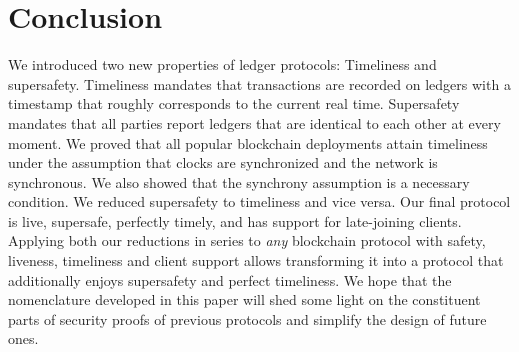 \section{Conclusion}

We introduced two new properties of ledger protocols:
Timeliness and supersafety. Timeliness mandates that transactions are
recorded on ledgers with a timestamp that roughly corresponds to the
current real time. Supersafety mandates that all parties
report ledgers that are identical to each other at every moment.
We proved that all popular blockchain
deployments attain timeliness under the assumption
that clocks are synchronized and the network is synchronous.
We also showed that the synchrony assumption is a necessary condition.
We reduced supersafety to timeliness and
vice versa.
Our final protocol is live, supersafe, perfectly timely,
and has support for late-joining clients. Applying both our reductions
in series to \emph{any} blockchain protocol with safety, liveness, timeliness and client support
allows transforming it into a protocol that additionally enjoys supersafety and perfect timeliness.
We hope that the nomenclature developed in this paper will shed some light on the constituent parts
of security proofs of previous protocols and simplify the design of
future ones.